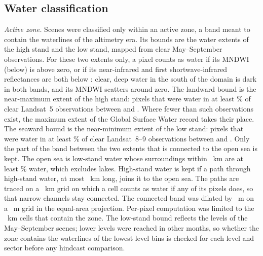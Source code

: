
\subsection*{Water classification}
\emph{Active zone.} Scenes were classified only within an active zone, a band meant to contain the waterlines of the altimetry era. Its bounds are the water extents of the  high stand and the  low stand, mapped from clear May--September observations. For these two extents only, a pixel counts as water if its MNDWI (below) is above zero, or if its near-infrared and first shortwave-infrared reflectances are both below : clear, deep water in the south of the domain is dark in both bands, and its MNDWI scatters around zero. The landward bound is the near-maximum extent of the high stand: pixels that were water in at least \% of clear Landsat~5 observations between  and . Where fewer than  such observations exist, the maximum extent of the Global Surface Water record\citep{pekel2016} takes their place. The seaward bound is the near-minimum extent of the low stand: pixels that were water in at least \% of clear Landsat~8--9 observations between  and . Only the part of the band between the two extents that is connected to the open sea is kept. The open sea is low-stand water whose surroundings within ~km are at least \% water, which excludes lakes. High-stand water is kept if a path through high-stand water, at most ~km long, joins it to the open sea. The paths are traced on a ~km grid on which a cell counts as water if any of its pixels does, so that narrow channels stay connected. The connected band was dilated by ~m on a ~m grid in the equal-area projection. Per-pixel computation was limited to the ~km cells that contain the zone. The low-stand bound reflects the levels of the May--September scenes; lower levels were reached in other months, so whether the zone contains the waterlines of the lowest level bins is checked for each level and sector before any hindcast comparison.

